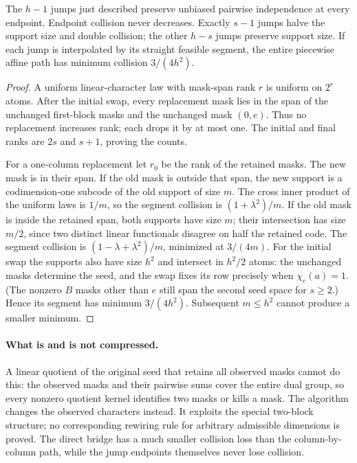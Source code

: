 \begin{proposition}\label{s15:prop:compression-jumps}
The $h-1$ jumps just described preserve unbiased pairwise independence
at every endpoint. Endpoint collision never decreases. Exactly $s-1$
jumps halve the support size and double collision; the other $h-s$
jumps preserve support size. If each jump is interpolated by its straight
feasible segment, the entire piecewise affine path has minimum collision
$3/(4h^2)$.
\end{proposition}
\begin{proof}
A uniform linear-character law with mask-span rank $r$ is uniform on
$2^r$ atoms. After the initial swap, every replacement mask lies in the
span of the unchanged first-block masks and the unchanged mask $(0,e)$.
Thus no replacement increases rank; each drops it by at most one.
The initial and final ranks are $2s$ and $s+1$, proving the counts.

For a one-column replacement let $r_0$ be the rank of the retained masks.
The new mask is in their span. If the old mask is outside that span, the
new support is a codimension-one subcode of the old support of size $m$.
The cross inner product of the uniform laws is $1/m$, so the segment
collision is $(1+\lambda^2)/m$. If the old mask is inside the retained
span, both supports have size $m$; their intersection has size $m/2$,
since two distinct linear functionals disagree on half the retained
code. The segment collision is
$(1-\lambda+\lambda^2)/m$, minimized at $3/(4m)$.
For the initial swap the supports also have size $h^2$ and intersect in
$h^2/2$ atoms: the unchanged masks determine the seed, and the swap
fixes its row precisely when $\chi_e(a)=1$. (The nonzero $B$ masks
other than $e$ still span the second seed space for $s\ge2$.) Hence
its segment has minimum $3/(4h^2)$. Subsequent $m\le h^2$ cannot
produce a smaller minimum.
\end{proof}

\paragraph{What is and is not compressed.}
A linear quotient of the original seed that retains all observed masks
cannot do this: the observed masks and their pairwise sums cover the
entire dual group, so every nonzero quotient kernel identifies two masks
or kills a mask. The algorithm changes the observed characters instead.
It exploits the special two-block structure; no corresponding rewiring
rule for arbitrary admissible dimensions is proved. The direct bridge
has a much smaller collision loss than the column-by-column path, while
the jump endpoints themselves never lose collision.

